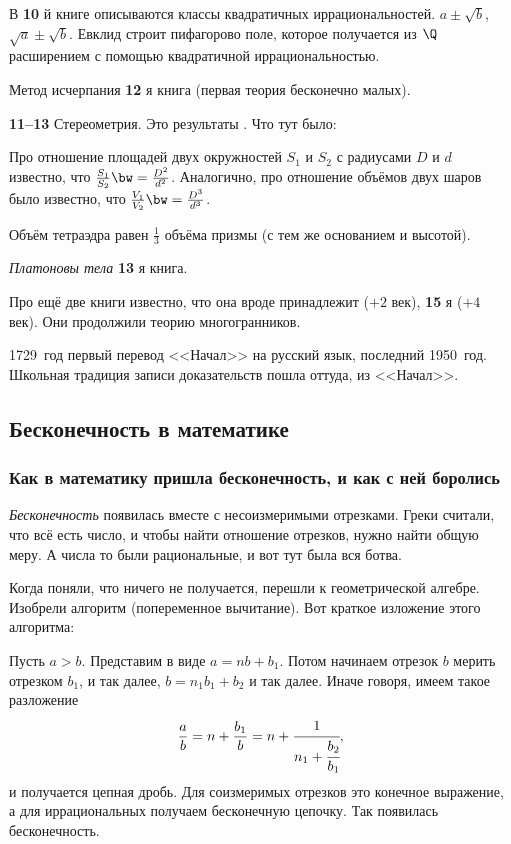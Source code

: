 \documentclass[a4paper,oneside,fleqn,10pt]{article}
\begin{document}
В \textbf{10} й книге описываются классы квадратичных
иррациональностей.  $a \pm \sqrt b$, $\sqrt a \pm \sqrt b$. Евклид
строит пифагорово поле, которое получается из $\Q$ расширением с
помощью квадратичной иррациональностью.

Метод исчерпания  \textbf{12} я книга (первая
теория бесконечно малых).

\textbf{11--13} Стереометрия. Это результаты .  Что тут было:

Про отношение площадей двух окружностей $S_1$ и $S_2$ с радиусами $D$
и $d$ известно, что $\frac{S_1}{S_2} \bw= \frac{D^2}{d^2}$.
Аналогично, про отношение объёмов двух шаров было известно, что
$\frac{V_1}{V_2} \bw= \frac{D^3}{d^3}$.

Объём тетраэдра равен $\frac13$ объёма призмы (с тем же основанием и
высотой).

\emph{Платоновы тела} \textbf{13} я книга.

Про ещё две книги известно, что она вроде принадлежит
 ($+2$ век), \textbf{15} я  ($+4$ век).  Они продолжили теорию многогранников.

1729~год первый перевод <<Начал>> на русский язык, последний 1950~год.
Школьная традиция записи доказательств пошла оттуда, из <<Начал>>.


\subsection{Бесконечность в математике}

\subsubsection{Как в математику пришла бесконечность, и как с ней боролись}

\emph{Бесконечность} появилась вместе с несоизмеримыми отрезками.
Греки считали, что всё есть число, и чтобы найти отношение отрезков,
нужно найти общую меру. А числа то были рациональные, и вот тут была
вся ботва.

Когда поняли, что ничего не получается, перешли к геометрической
алгебре.  Изобрели алгоритм  (попеременное
вычитание). Вот краткое изложение этого алгоритма:

Пусть $a > b$. Представим в виде $a = nb + b_1$. Потом начинаем
отрезок $b$ мерить отрезком $b_1$, и так далее, $b = n_1b_1 + b_2$ и
так далее.  Иначе говоря, имеем такое разложение
$$\frac ab = n + \frac{b_1}{b} = n + \cfrac{1}{n_1 +
  \cfrac{b_2}{b_1}},$$ и получается цепная дробь. Для соизмеримых
отрезков это конечное выражение, а для иррациональных получаем
бесконечную цепочку.  Так появилась бесконечность.
\end{document}
